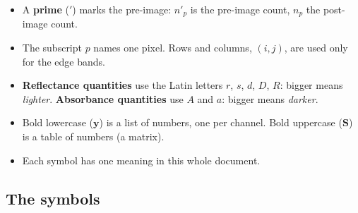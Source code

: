\documentclass[11pt,letter]{article}
\newcommand{\vy}{\mathbf{y}}
\newcommand{\mS}{\mathbf{S}}
\begin{document}
\begin{itemize}[nosep]
  \item A \textbf{prime} ($'$) marks the pre-image: $n'_p$ is the pre-image
    count, $n_p$ the post-image count.
  \item The subscript $p$ names one pixel.  Rows and columns, $(i, j)$, are
    used only for the edge bands.
  \item \textbf{Reflectance quantities} use the Latin letters $r$, $s$,
    $d$, $D$, $R$: bigger means \emph{lighter}.  \textbf{Absorbance
    quantities} use $A$ and $a$: bigger means \emph{darker}.
  \item Bold lowercase ($\vy$) is a list of numbers, one per channel.  Bold
    uppercase ($\mS$) is a table of numbers (a matrix).
  \item Each symbol has one meaning in this whole document.
\end{itemize}

\subsection{The symbols}
\end{document}
